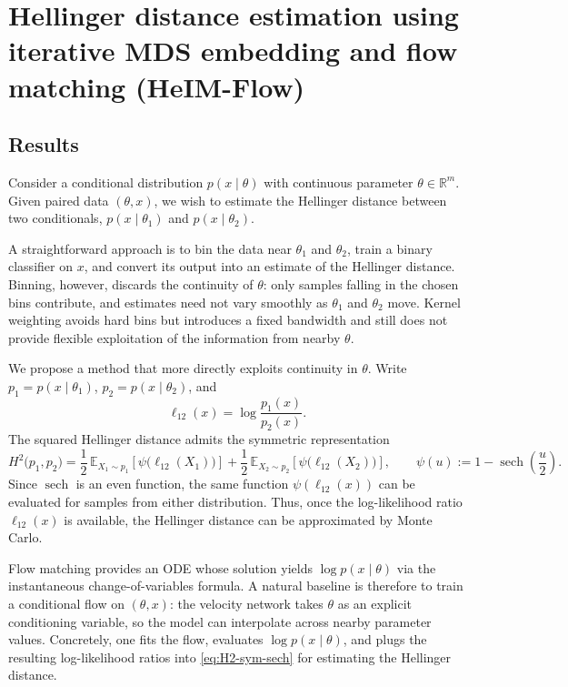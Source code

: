 \section{Hellinger distance estimation using iterative MDS embedding and flow matching (HeIM-Flow)}

\subsection{Results}

Consider a conditional distribution $p(x \mid \theta)$ with continuous parameter $\theta \in \mathbb{R}^m$. Given paired data $(\theta, x)$, we wish to estimate the Hellinger distance between two conditionals, $p(x \mid \theta_1)$ and $p(x \mid \theta_2)$.

A straightforward approach is to bin the data near $\theta_1$ and $\theta_2$, train a binary classifier on $x$, and convert its output into an estimate of the Hellinger distance. Binning, however, discards the continuity of $\theta$: only samples falling in the chosen bins contribute, and estimates need not vary smoothly as $\theta_1$ and $\theta_2$ move. Kernel weighting avoids hard bins but introduces a fixed bandwidth and still does not provide flexible exploitation of the information from nearby $\theta$.

We propose a method that more directly exploits continuity in $\theta$. Write $p_1 = p(x \mid \theta_1)$, $p_2 = p(x \mid \theta_2)$, and
\begin{equation}
    \ell_{12}(x) = \log \frac{p_1(x)}{p_2(x)}.
\end{equation}
The squared Hellinger distance admits the symmetric representation
\begin{equation}
\label{eq:H2-sym-sech}
H^2\bigl(p_1, p_2\bigr)
=
\frac{1}{2}\,
\mathbb{E}_{X_1 \sim p_1}
\left[\psi\bigl(\ell_{12}(X_1)\bigr)\right]
+
\frac{1}{2}\,
\mathbb{E}_{X_2 \sim p_2}
\left[\psi\bigl(\ell_{12}(X_2)\bigr)\right],
\qquad
\psi(u) := 1 - \operatorname{sech}\!\left( \frac{u}{2} \right).
\end{equation}
Since $\operatorname{sech}$ is an even function, the same function $\psi(\ell_{12}(x))$ can be evaluated for samples from either distribution. Thus, once the log-likelihood ratio $\ell_{12}(x)$ is available, the Hellinger distance can be approximated by Monte Carlo.

Flow matching provides an ODE whose solution yields $\log p(x \mid \theta)$ via the instantaneous change-of-variables formula. A natural baseline is therefore to train a conditional flow on $(\theta, x)$: the velocity network takes $\theta$ as an explicit conditioning variable, so the model can interpolate across nearby parameter values. Concretely, one fits the flow, evaluates $\log p(x \mid \theta)$, and plugs the resulting log-likelihood ratios into \eqref{eq:H2-sym-sech} for estimating the Hellinger distance.

